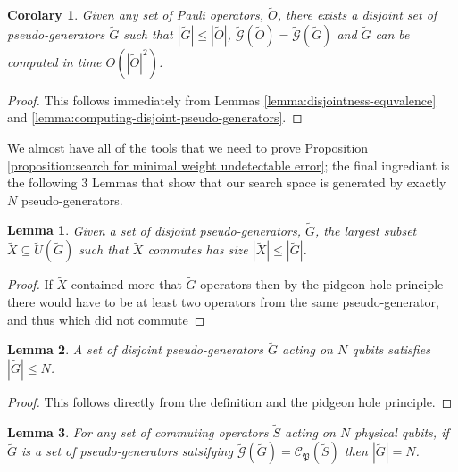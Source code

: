 \documentclass[twocolumn,showpacs,preprintnumbers,amsmath,amssymb,nofootinbib,pra,floatfix]{revtex4-1}
\newtheorem{lemma}{Lemma}
\newtheorem{corolary}{Corolary}
\newenvironment{remark}[1][Remark]{\begin{trivlist}
\item[\hskip \labelsep {\bfseries #1}]}{\end{trivlist}}
\newcommand{\set}{\tilde}
\newcommand{\genfun}{\tilde{\mathcal{G}}}
\newcommand{\pauligroup}{\mathfrak{P}}
\newcommand{\centralizer}{\mathcal{C}}
\begin{document}
\begin{corolary}
\label{corolary:computing-disjoint-pseudo-generators}
Given any set of Pauli operators, $\set O$, there exists a disjoint set of pseudo-generators $\set G$ such that $|\set G|\le|\set O|$, $\genfun(\set O)=\genfun(\set G)$ and $\set G$ can be computed in time $O(|\set O|^2)$.
\end{corolary}

\begin{proof}
This follows immediately from Lemmas \ref{lemma:disjointness-equvalence} and \ref{lemma:computing-disjoint-pseudo-generators}.
\end{proof}
\begin{remark}
We almost have all of the tools that we need to prove Proposition \ref{proposition:search for minimal weight undetectable error};  the final ingrediant is the following 3 Lemmas that show that our search space is generated by exactly $N$ pseudo-generators.
\end{remark}

\begin{lemma}
\label{lemma:lower bound on number of disjoint pseudo-generators}
Given a set of disjoint pseudo-generators, $\set G$, the largest subset $\set X\subseteq\set U(\set G)$ such that $\set X$ commutes has size $|\set X|\le|\set G|$.
\end{lemma}

\begin{proof}
If $\set X$ contained more that $\set G$ operators then by the pidgeon hole principle there would have to be at least two operators from the same pseudo-generator, and thus which did not commute
\end{proof}

\begin{lemma}
\label{lemma:upper bound on number of disjoint pseudo-generators}
A set of disjoint pseudo-generators $\set G$ acting on $N$ qubits satisfies $|\set G|\le N$.
\end{lemma}

\begin{proof}
This follows directly from the definition and the pidgeon hole principle.
\end{proof}

\begin{lemma}
\label{lemma:exact bound on number of disjoint pseudo-generators}
For any set of commuting operators $\set S$ acting on $N$ physical qubits, if $\set G$ is a set of pseudo-generators satsifying $\genfun(\set G)=\centralizer_\pauligroup(\set S)$ then $|\set G|= N$.
\end{lemma}
\end{document}
